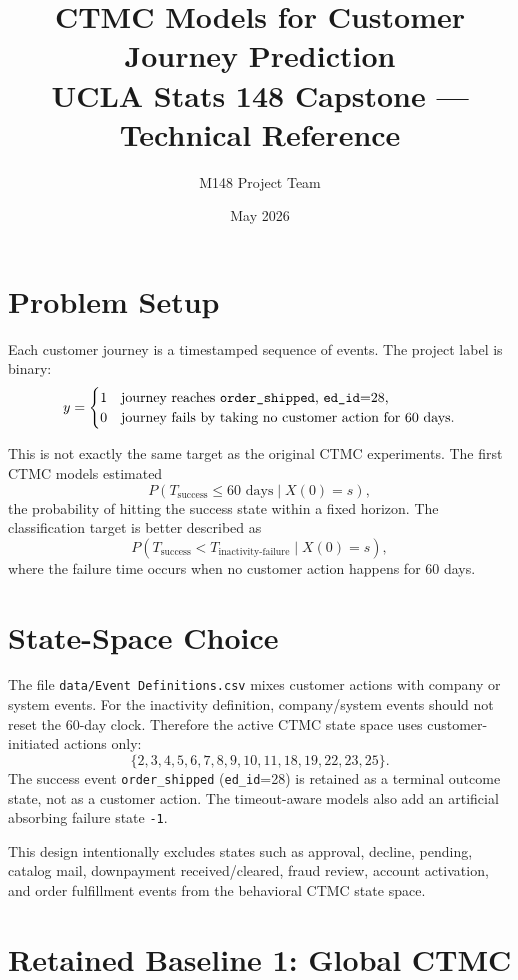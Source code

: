 \documentclass[11pt]{article}
\title{\textbf{CTMC Models for Customer Journey Prediction}\\[0.4em]
\large UCLA Stats 148 Capstone --- Technical Reference}
\author{M148 Project Team}
\date{May 2026}
\begin{document}
\maketitle
\tableofcontents
\newpage

\section{Problem Setup}

Each customer journey is a timestamped sequence of events. The project label is
binary:
\[
    y =
    \begin{cases}
    1 & \text{journey reaches \texttt{order\_shipped}, \texttt{ed\_id}=28,} \\
    0 & \text{journey fails by taking no customer action for 60 days.}
    \end{cases}
\]

This is not exactly the same target as the original CTMC experiments. The first
CTMC models estimated
\[
    P(T_{\text{success}} \leq 60\text{ days} \mid X(0)=s),
\]
the probability of hitting the success state within a fixed horizon. The
classification target is better described as
\[
    P(T_{\text{success}} < T_{\text{inactivity-failure}} \mid X(0)=s),
\]
where the failure time occurs when no customer action happens for 60 days.

\section{State-Space Choice}

The file \texttt{data/Event Definitions.csv} mixes customer actions with
company or system events. For the inactivity definition, company/system events
should not reset the 60-day clock. Therefore the active CTMC state space uses
customer-initiated actions only:
\[
\{2,3,4,5,6,7,8,9,10,11,18,19,22,23,25\}.
\]
The success event \texttt{order\_shipped} (\texttt{ed\_id}=28) is retained as a
terminal outcome state, not as a customer action. The timeout-aware models also
add an artificial absorbing failure state \texttt{-1}.

This design intentionally excludes states such as approval, decline, pending,
catalog mail, downpayment received/cleared, fraud review, account activation,
and order fulfillment events from the behavioral CTMC state space.

\section{Retained Baseline 1: Global CTMC}
\end{document}
